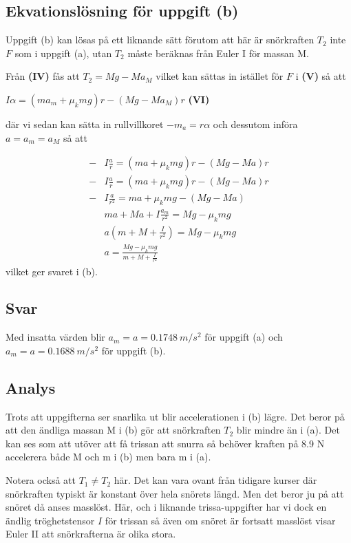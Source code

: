 \documentclass[11pt]{article}
\begin{document}
    \hypertarget{ekvationsluxf6sning-fuxf6r-uppgift-b}{%
\subsection{Ekvationslösning för uppgift
(b)}\label{ekvationsluxf6sning-fuxf6r-uppgift-b}}

Uppgift (b) kan lösas på ett liknande sätt förutom att här är
snörkraften \(T_2\) inte \(F\) som i uppgift (a), utan \(T_2\) måste
beräknas från Euler I för massan M.

Från \textbf{(IV)} fås att \(T_2=Mg-Ma_M\) vilket kan sättas in istället
för \(F\) i \textbf{(V)} så att

\(I\alpha = (m a_m+\mu_k mg) r - (Mg-Ma_M)r\) \textbf{(VI)}

där vi sedan kan sätta in rullvillkoret \(-m_a=r\alpha\) och dessutom
införa \(a=a_m=a_M\) så att

\begin{align}
-&I\frac{a}{r} = (m a+\mu_k mg) r - (Mg-Ma)r \\
-&I\frac{a}{r} = (m a+\mu_k mg) r - (Mg-Ma)r \\
-&I\frac{a}{r^2} = m a+\mu_k mg - (Mg-Ma) \\
& m a + M a +I\frac{a_m}{r^2} = Mg -\mu_k mg \\
& a (m+M+\frac{I}{r^2}) = Mg-\mu_k mg \\
& a = \frac{Mg-\mu_k mg}{m+M+\frac{I}{r^2}}
\end{align}
vilket ger svaret i (b).

    \hypertarget{svar}{%
\subsection{Svar}\label{svar}}

Med insatta värden blir \(a_m=a=0.1748~m/s^2\) för uppgift (a) och
\(a_m=a=0.1688~m/s^2\) för uppgift (b).

    \hypertarget{analys}{%
\subsection{Analys}\label{analys}}

Trots att uppgifterna ser snarlika ut blir accelerationen i (b) lägre.
Det beror på att den ändliga massan M i (b) gör att snörkraften \(T_2\)
blir mindre än i (a). Det kan ses som att utöver att få trissan att
snurra så behöver kraften på 8.9 N accelerera både M och m i (b) men
bara m i (a).

Notera också att \(T_1\neq T_2\) här. Det kan vara ovant från tidigare
kurser där snörkraften typiskt är konstant över hela snörets längd. Men
det beror ju på att snöret då anses masslöst. Här, och i liknande
trissa-uppgifter har vi dock en ändlig tröghetstensor \(I\) för trissan
så även om snöret är fortsatt masslöst visar Euler II att snörkrafterna
är olika stora.
\end{document}
